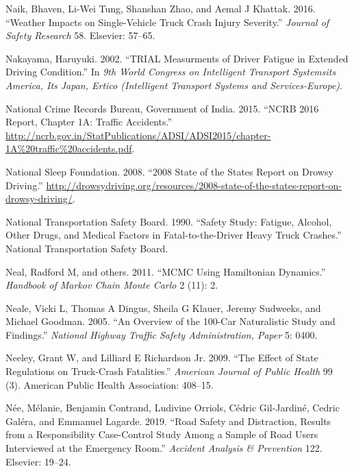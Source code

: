 \documentclass[12pt]{book}
\numberwithin{equation}{chapter}
\begin{document}
\leavevmode\hypertarget{ref-naik2016weather}{}%
Naik, Bhaven, Li-Wei Tung, Shanshan Zhao, and Aemal J Khattak. 2016. ``Weather Impacts on Single-Vehicle Truck Crash Injury Severity.'' \emph{Journal of Safety Research} 58. Elsevier: 57--65.

\leavevmode\hypertarget{ref-nakayama2002trial}{}%
Nakayama, Haruyuki. 2002. ``TRIAL Measurments of Driver Fatigue in Extended Driving Condition.'' In \emph{9th World Congress on Intelligent Transport Systemsits America, Its Japan, Ertico (Intelligent Transport Systems and Services-Europe)}.

\leavevmode\hypertarget{ref-india2015}{}%
National Crime Records Bureau, Government of India. 2015. ``NCRB 2016 Report, Chapter 1A: Traffic Accidents.'' \url{http://ncrb.gov.in/StatPublications/ADSI/ADSI2015/chapter-1A\%20traffic\%20accidents.pdf}.

\leavevmode\hypertarget{ref-nsleepf}{}%
National Sleep Foundation. 2008. ``2008 State of the States Report on Drowsy Driving.'' \url{http://drowsydriving.org/resources/2008-state-of-the-states-report-on-drowsy-driving/}.

\leavevmode\hypertarget{ref-ntsb1990}{}%
National Transportation Safety Board. 1990. ``Safety Study: Fatigue, Alcohol, Other Drugs, and Medical Factors in Fatal-to-the-Driver Heavy Truck Crashes.'' National Transportation Safety Board.

\leavevmode\hypertarget{ref-neal2011mcmc}{}%
Neal, Radford M, and others. 2011. ``MCMC Using Hamiltonian Dynamics.'' \emph{Handbook of Markov Chain Monte Carlo} 2 (11): 2.

\leavevmode\hypertarget{ref-neale2005overview}{}%
Neale, Vicki L, Thomas A Dingus, Sheila G Klauer, Jeremy Sudweeks, and Michael Goodman. 2005. ``An Overview of the 100-Car Naturalistic Study and Findings.'' \emph{National Highway Traffic Safety Administration, Paper} 5: 0400.

\leavevmode\hypertarget{ref-neeley2009effect}{}%
Neeley, Grant W, and Lilliard E Richardson Jr. 2009. ``The Effect of State Regulations on Truck-Crash Fatalities.'' \emph{American Journal of Public Health} 99 (3). American Public Health Association: 408--15.

\leavevmode\hypertarget{ref-nee2019road}{}%
Née, Mélanie, Benjamin Contrand, Ludivine Orriols, Cédric Gil-Jardiné, Cedric Galéra, and Emmanuel Lagarde. 2019. ``Road Safety and Distraction, Results from a Responsibility Case-Control Study Among a Sample of Road Users Interviewed at the Emergency Room.'' \emph{Accident Analysis \& Prevention} 122. Elsevier: 19--24.
\end{document}
